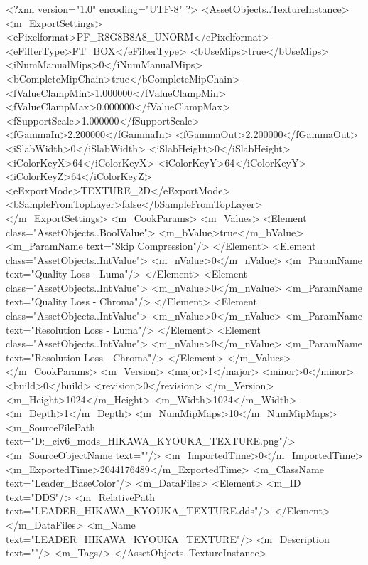 <?xml version="1.0" encoding="UTF-8" ?>
<AssetObjects..TextureInstance>
	<m_ExportSettings>
		<ePixelformat>PF_R8G8B8A8_UNORM</ePixelformat>
		<eFilterType>FT_BOX</eFilterType>
		<bUseMips>true</bUseMips>
		<iNumManualMips>0</iNumManualMips>
		<bCompleteMipChain>true</bCompleteMipChain>
		<fValueClampMin>1.000000</fValueClampMin>
		<fValueClampMax>0.000000</fValueClampMax>
		<fSupportScale>1.000000</fSupportScale>
		<fGammaIn>2.200000</fGammaIn>
		<fGammaOut>2.200000</fGammaOut>
		<iSlabWidth>0</iSlabWidth>
		<iSlabHeight>0</iSlabHeight>
		<iColorKeyX>64</iColorKeyX>
		<iColorKeyY>64</iColorKeyY>
		<iColorKeyZ>64</iColorKeyZ>
		<eExportMode>TEXTURE_2D</eExportMode>
		<bSampleFromTopLayer>false</bSampleFromTopLayer>
	</m_ExportSettings>
	<m_CookParams>
		<m_Values>
			<Element class="AssetObjects..BoolValue">
				<m_bValue>true</m_bValue>
				<m_ParamName text="Skip Compression"/>
			</Element>
			<Element class="AssetObjects..IntValue">
				<m_nValue>0</m_nValue>
				<m_ParamName text="Quality Loss - Luma"/>
			</Element>
			<Element class="AssetObjects..IntValue">
				<m_nValue>0</m_nValue>
				<m_ParamName text="Quality Loss - Chroma"/>
			</Element>
			<Element class="AssetObjects..IntValue">
				<m_nValue>0</m_nValue>
				<m_ParamName text="Resolution Loss - Luma"/>
			</Element>
			<Element class="AssetObjects..IntValue">
				<m_nValue>0</m_nValue>
				<m_ParamName text="Resolution Loss - Chroma"/>
			</Element>
		</m_Values>
	</m_CookParams>
	<m_Version>
		<major>1</major>
		<minor>0</minor>
		<build>0</build>
		<revision>0</revision>
	</m_Version>
	<m_Height>1024</m_Height>
	<m_Width>1024</m_Width>
	<m_Depth>1</m_Depth>
	<m_NumMipMaps>10</m_NumMipMaps>
	<m_SourceFilePath text="D:\Documents\GitHub\Uzuki_civ6_mods\LandsolKyouka\LEADER_HIKAWA_KYOUKA_TEXTURE.png"/>
	<m_SourceObjectName text=""/>
	<m_ImportedTime>0</m_ImportedTime>
	<m_ExportedTime>2044176489</m_ExportedTime>
	<m_ClassName text="Leader_BaseColor"/>
	<m_DataFiles>
		<Element>
			<m_ID text="DDS"/>
			<m_RelativePath text="LEADER_HIKAWA_KYOUKA_TEXTURE.dds"/>
		</Element>
	</m_DataFiles>
	<m_Name text="LEADER_HIKAWA_KYOUKA_TEXTURE"/>
	<m_Description text=""/>
	<m_Tags/>
</AssetObjects..TextureInstance>

